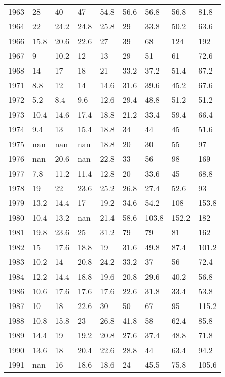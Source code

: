 \documentclass{standalone}
\begin{document}
\begin{tabular}{lllllllll}
1963 & 28   & 40   & 47   & 54.8 & 56.6 & 56.8  & 56.8  & 81.8  \\
1964 & 22   & 24.2 & 24.8 & 25.8 & 29   & 33.8  & 50.2  & 63.6  \\
1966 & 15.8 & 20.6 & 22.6 & 27   & 39   & 68    & 124   & 192   \\
1967 & 9    & 10.2 & 12   & 13   & 29   & 51    & 61    & 72.6  \\
1968 & 14   & 17   & 18   & 21   & 33.2 & 37.2  & 51.4  & 67.2  \\
1971 & 8.8  & 12   & 14   & 14.6 & 31.6 & 39.6  & 45.2  & 67.6  \\
1972 & 5.2  & 8.4  & 9.6  & 12.6 & 29.4 & 48.8  & 51.2  & 51.2  \\
1973 & 10.4 & 14.6 & 17.4 & 18.8 & 21.2 & 33.4  & 59.4  & 66.4  \\
1974 & 9.4  & 13   & 15.4 & 18.8 & 34   & 44    & 45    & 51.6  \\
1975 & nan  & nan  & nan  & 18.8 & 20   & 30    & 55    & 97    \\
1976 & nan  & 20.6 & nan  & 22.8 & 33   & 56    & 98    & 169   \\
1977 & 7.8  & 11.2 & 11.4 & 12.8 & 20   & 33.6  & 45    & 68.8  \\
1978 & 19   & 22   & 23.6 & 25.2 & 26.8 & 27.4  & 52.6  & 93    \\
1979 & 13.2 & 14.4 & 17   & 19.2 & 34.6 & 54.2  & 108   & 153.8 \\
1980 & 10.4 & 13.2 & nan  & 21.4 & 58.6 & 103.8 & 152.2 & 182   \\
1981 & 19.8 & 23.6 & 25   & 31.2 & 79   & 79    & 81    & 162   \\
1982 & 15   & 17.6 & 18.8 & 19   & 31.6 & 49.8  & 87.4  & 101.2 \\
1983 & 10.2 & 14   & 20.8 & 24.2 & 33.2 & 37    & 56    & 72.4  \\
1984 & 12.2 & 14.4 & 18.8 & 19.6 & 20.8 & 29.6  & 40.2  & 56.8  \\
1986 & 10.6 & 17.6 & 17.6 & 17.6 & 22.6 & 31.8  & 33.4  & 53.8  \\
1987 & 10   & 18   & 22.6 & 30   & 50   & 67    & 95    & 115.2 \\
1988 & 10.8 & 15.8 & 23   & 26.8 & 41.8 & 58    & 62.4  & 85.8  \\
1989 & 14.4 & 19   & 19.2 & 20.8 & 27.6 & 37.4  & 48.8  & 71.8  \\
1990 & 13.6 & 18   & 20.4 & 22.6 & 28.8 & 44    & 63.4  & 94.2  \\
1991 & nan  & 16   & 18.6 & 18.6 & 24   & 45.5  & 75.8  & 105.6 \\

\end{tabular}
\end{document}
